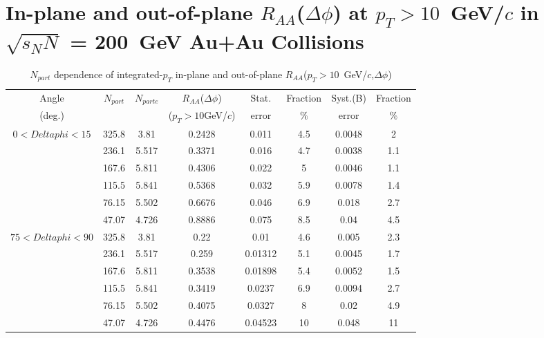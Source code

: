 \chapter{In-plane and out-of-plane $R_{AA}$($\Delta\phi$) at $p_{T}>10$~GeV/$c$ in $\sqrt{s_NN}$ = 200~GeV Au+Au Collisions}
\begin{table}[!htb]
\centering
\begin{tabular}{cccccccc}
\hline
\hline
Angle & $N_{part}$ & $N_{parte}$ & $R_{AA}$($\Delta\phi$) & Stat. & Fraction & Syst.(B) & Fraction \\
(deg.) & & & ($p_{T}>10$GeV/$c$) & error & $\%$ & error & $\%$ \\
\hline
$0<Deltaphi<15$ & 325.8 & 3.81 & 0.2428 & 0.011 & 4.5 & 0.0048 & 2 \\ 
  & 236.1 & 5.517 & 0.3371 & 0.016 & 4.7 & 0.0038 & 1.1 \\ 
  & 167.6 & 5.811 & 0.4306 & 0.022 & 5 & 0.0046 & 1.1 \\ 
  & 115.5 & 5.841 & 0.5368 & 0.032 & 5.9 & 0.0078 & 1.4 \\ 
  & 76.15 & 5.502 & 0.6676 & 0.046 & 6.9 & 0.018 & 2.7 \\ 
  & 47.07 & 4.726 & 0.8886 & 0.075 & 8.5 & 0.04 & 4.5 \\ 
\hline
$75<Deltaphi<90$ & 325.8 & 3.81 & 0.22 & 0.01 & 4.6 & 0.005 & 2.3 \\ 
  & 236.1 & 5.517 & 0.259 & 0.01312 & 5.1 & 0.0045 & 1.7 \\ 
  & 167.6 & 5.811 & 0.3538 & 0.01898 & 5.4 & 0.0052 & 1.5 \\ 
  & 115.5 & 5.841 & 0.3419 & 0.0237 & 6.9 & 0.0094 & 2.7 \\ 
  & 76.15 & 5.502 & 0.4075 & 0.0327 & 8 & 0.02 & 4.9 \\ 
  & 47.07 & 4.726 & 0.4476 & 0.04523 & 10 & 0.048 & 11 \\ 
\hline
\hline
\end{tabular}
\caption{$N_{part}$ dependence of integrated-$p_{T}$ in-plane and out-of-plane $R_{AA}$($p_{T}>10$~GeV/$c$,$\Delta\phi$)}
\end{table}
            
            
